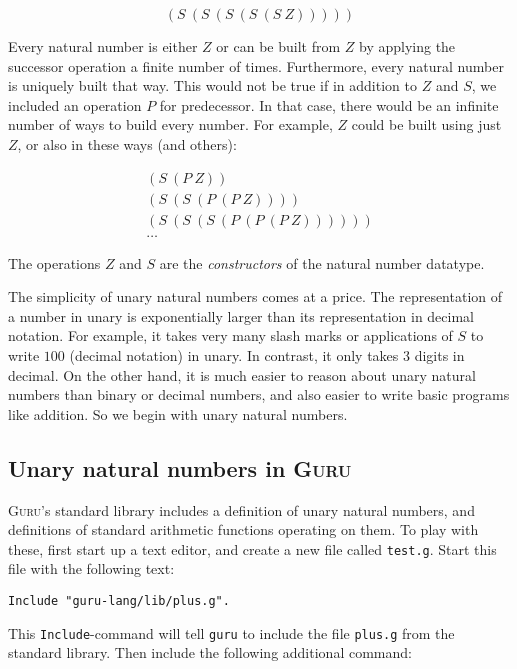 \documentclass{book}[12pt]
\newcommand{\guru}[0]{\textsc{Guru}}
\begin{document}
\[ (S\ (S\ (S\ (S\ (S\ Z))))) \]

Every natural number is either $Z$ or can be built from $Z$ by
applying the successor operation a finite number of times.
Furthermore, every natural number is uniquely built that way.  This
would not be true if in addition to $Z$ and $S$, we included an
operation $P$ for predecessor.  In that case, there would be an
infinite number of ways to build every number.  For example, $Z$ could
be built using just $Z$, or also in these ways (and others):

\[ 
\begin{array}{l}
(S\ (P\ Z)) \\
(S\ (S\ (P\ (P\ Z)))) \\
(S\ (S\ (S\ (P\ (P\ (P\ Z)))))) \\
\ldots
\end{array}
\]

\noindent The operations $Z$ and $S$ are the \emph{constructors} of
the natural number datatype.

The simplicity of unary natural numbers comes at a price.  The
representation of a number in unary is exponentially larger than its
representation in decimal notation.  For example, it takes very many
slash marks or applications of $S$ to write $100$ (decimal notation)
in unary.  In contrast, it only takes 3 digits in decimal.  On the
other hand, it is much easier to reason about unary natural numbers
than binary or decimal numbers, and also easier to write basic
programs like addition.  So we begin with unary natural numbers.

\subsection{Unary natural numbers in \guru}
\label{sec:natguru}

\guru's standard library includes a definition of unary natural
numbers, and definitions of standard arithmetic functions operating on
them.  To play with these, first start up a text editor, and create a
new file called \texttt{test.g}.  Start this file with the following
text:

\begin{verbatim}
Include "guru-lang/lib/plus.g".
\end{verbatim}

\noindent This \texttt{Include}-command will tell \texttt{guru} to
include the file \texttt{plus.g} from the standard library.  Then
include the following additional command:
\end{document}
